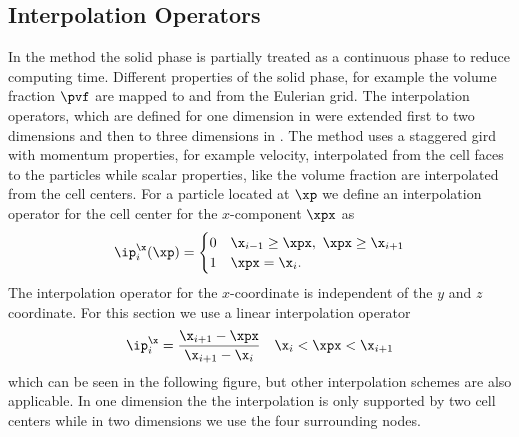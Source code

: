 \subsection{Interpolation Operators}
In the \MP method the solid phase is partially treated as a continuous phase to reduce computing time.
Different properties of the solid phase, for example the volume fraction $\pvf$ are mapped to and from the Eulerian grid.
The interpolation operators, which are defined for one dimension in \cite{MPPICFirst} were extended first to two dimensions \cite{MP2d} and then to three dimensions in \cite{MPInterpolation}.
The \MP method uses a staggered gird with momentum properties, for example velocity, interpolated from the cell faces to the particles while scalar properties, like the volume fraction are interpolated from the cell centers.
For a particle located at $\xp$ we define an interpolation operator for the cell center for the $x$-component $\xpx$ as
\begin{equation}
    \ip_i^\x (\xp) = \begin{cases}
        0 & \x_{i-1} \geq \xpx, \ \xpx \geq \x_{i+1} \\
        1 & \xpx = \x_{i}.
    \end{cases}
\end{equation}
The interpolation operator for the $x$-coordinate is independent of the $y$ and $z$ coordinate.
For this section we use a linear interpolation operator
\begin{equation}
    \ip_{i}^\x = \dfrac{\x_{i+1}- \xpx}{\x_{i+1} - \x_i} \quad \x_{i} < \xpx < \x_{i+1}
\end{equation}
which can be seen in the following figure, but other interpolation schemes are also applicable.
In one dimension the the interpolation is only supported by two cell centers while in two dimensions we use the four surrounding nodes. 


